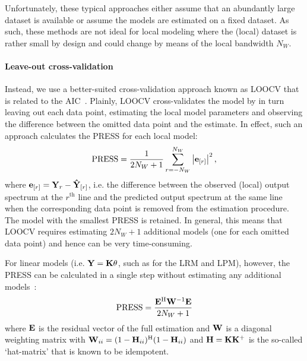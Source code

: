 \begin{remark}
Unfortunately, these typical approaches either assume that an abundantly large dataset is available or  assume the models are estimated on  a fixed dataset.
As such, these methods are not ideal for local modeling where the (local) dataset is rather small by design and could change by means of the local bandwidth $N_W$.
\end{remark}

\paragraph{Leave-out cross-validation}
Instead, we use a better-suited cross-validation approach known as \gls{LOOCV} that is related to the \gls{AIC}~\citep{Stone1977}.
Plainly, \gls{LOOCV} cross-validates the model by in turn leaving out each data point, estimating the local model parameters and observing the difference between the omitted data point and the estimate.
In effect, such an approach calculates the \gls{PRESS} for each local model:
\begin{equation}
 \PRESS = \frac{1}{2N_W+1} \sum_{r=-N_W}^{N_W} 
                          \abs{\ignoring{r}{\LocalVector{e}}}^2
                          \text{,}
\label{eq:PRESS-general}
\end{equation}
where $\ignoring{r}{\LocalVector{e}} = \LocalVector{Y}_{r} - \ignoring{r}{\LocalVector{\estimated{Y}}}$, i.e. the difference between the observed (local) output spectrum at the $r^{\text{th}}$ line and the predicted output spectrum at the same line when the corresponding data point is removed from the estimation procedure.
The model with the smallest \gls{PRESS} is retained.
In general, this means that \gls{LOOCV} requires estimating $2N_W + 1$ additional models (one for each omitted data point) and hence can be very time-consuming.

For linear models (i.e. $\LocalVector{Y} = \LocalVector{K} \LocalVector{\theta}$, such as for the \gls{LRM} and \gls{LPM}), however, the \gls{PRESS} can be calculated in a single step without estimating any additional models~\citep[Sec.~12.3.2]{Seber2003}:
\begin{equation}
\PRESS = \frac{\LocalVector{E}^{\HT} \LocalVector{W}^{-1} \LocalVector{E}}{2N_W + 1}
\end{equation}
where $\LocalVector{E}$ is the residual vector of the full estimation and $\LocalVector{W}$ is a diagonal weighting matrix with $\LocalVector{W}_{ii} = (1 - \LocalVector{H}_{ii})^{\HT} (1 - \LocalVector{H}_{ii})$ and
$\LocalVector{H} = \LocalVector{K} \pinv{\LocalVector{K}}$ is the so-called `hat-matrix' that is known to be idempotent.


